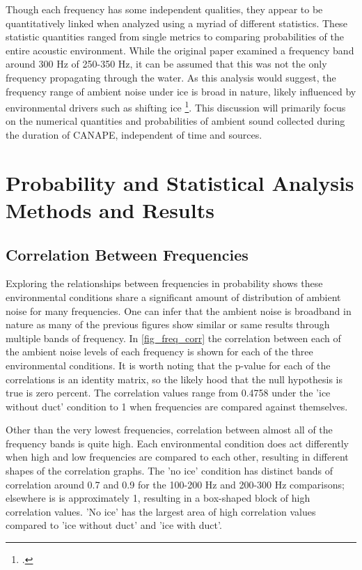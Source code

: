 Though each frequency has some independent qualities, they appear to be quantitatively linked when analyzed using a myriad of different statistics. These statistic quantities ranged from single metrics to comparing probabilities of the entire acoustic environment. While the original paper examined a frequency band around 300 Hz of 250-350 Hz, it can be assumed that this was not the only frequency propagating through the water. As this analysis would suggest, the frequency range of ambient noise under ice is broad in nature, likely influenced by environmental drivers such as shifting ice \footcite[]{ice_enviro}. This discussion will primarily focus on the numerical quantities and probabilities of ambient sound collected during the duration of CANAPE, independent of time and sources.



\section{Probability and Statistical Analysis Methods and Results}

\subsection{Correlation Between Frequencies} \label{sec_corr_freq}

Exploring the relationships between frequencies in probability shows these environmental conditions share a significant amount of distribution of ambient noise for many frequencies. One can infer that the ambient noise is broadband in nature as many of the previous figures show similar or same results through multiple bands of frequency. In \autoref{fig_freq_corr} the correlation between each of the ambient noise levels of each frequency is shown for each of the three environmental conditions. It is worth noting that the p-value for each of the correlations is an identity matrix, so the likely hood that the null hypothesis is true is zero percent. The correlation values range from 0.4758 under the 'ice without duct' condition to 1 when frequencies are compared against themselves. 

Other than the very lowest frequencies, correlation between almost all of the frequency bands is quite high.  Each environmental condition does act differently when high and low frequencies are compared to each other, resulting in different shapes of the correlation graphs. The 'no ice' condition has distinct bands of correlation around 0.7 and 0.9 for the 100-200 Hz and 200-300 Hz comparisons; elsewhere is is approximately 1, resulting in a box-shaped block of high correlation values. 'No ice' has the largest area of high correlation values compared to 'ice without duct' and 'ice with duct'.

